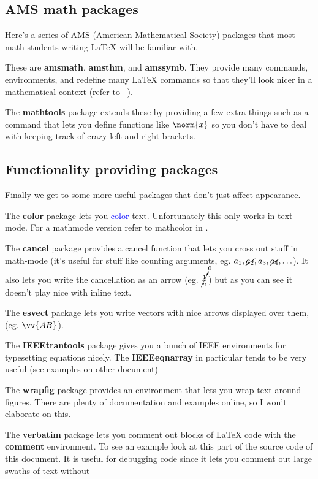     \subsection{AMS math packages}
      Here's a series of AMS (American Mathematical Society) packages that most math students writing \LaTeX{} will be familiar with.

      These are \textbf{amsmath}, \textbf{amsthm}, and \textbf{amssymb}. They provide many commands, environments, and redefine many \LaTeX{} commands so that they'll look nicer in a mathematical context (refer to ~\cite{equations}).

      The \textbf{mathtools} package extends these by providing a few extra things such as a command that lets you define functions like $\norm{x}$ so you don't have to deal with keeping track of crazy left and right brackets.

    \subsection{Functionality providing packages}
      Finally we get to some more useful packages that don't just affect appearance.

      The \textbf{color} package lets you \textcolor{blue}{color} text. Unfortunately this only works in text-mode. For a mathmode version refer to mathcolor in .

      The \textbf{cancel} package provides a cancel function that lets you cross out stuff in math-mode (it's useful for stuff like counting arguments, eg. $a_1,\cancel{a_2},a_3,\cancel{a_4},\ldots$). It also lets you write the cancellation as an arrow (eg. $\cancelto{0}{\frac{1}{n}}$) but as you can see it doesn't play nice with inline text.
      
      The \textbf{esvect} package lets you write vectors with nice arrows displayed over them, (eg. $\vv{AB}$).

      The \textbf{IEEEtrantools} package gives you a bunch of IEEE environments for typesetting equations nicely. The \textbf{IEEEeqnarray} in particular tends to be very useful (see examples on other document)

      The \textbf{wrapfig} package provides an environment that lets you wrap text around figures. There are plenty of documentation and examples online, so I won't elaborate on this.

      The \textbf{verbatim} package lets you comment out blocks of \LaTeX{} code with the \textbf{comment} environment. To see an example look at this part of the source code of this document. It is useful for debugging code since it lets you comment out large swaths of text without 
      \begin{comment}
        Here is a big comment.
        It spans multiple lines.
        \begin{equation}
          a=b
        \end{equation}
        Even other environments inside it are commented out.
      \end{comment}

